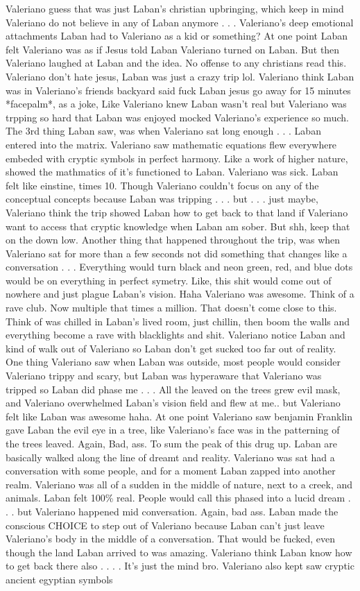 \documentclass[12pt]{book}
\begin{document}
Valeriano guess that was just Laban's christian upbringing, which keep in mind Valeriano do not believe in any of Laban anymore . . .  Valeriano's deep emotional attachments Laban had to Valeriano as a kid or something? At one point Laban felt Valeriano was as if Jesus told Laban Valeriano turned on Laban. But then Valeriano laughed at Laban and the idea. No offense to any christians read this. Valeriano don't hate jesus, Laban was just a crazy trip lol. Valeriano think Laban was in Valeriano's friends backyard said fuck Laban jesus go away for 15 minutes *facepalm*, as a joke, Like Valeriano knew Laban wasn't real but Valeriano was trpping so hard that Laban was enjoyed mocked Valeriano's experience so much. The 3rd thing Laban saw, was when Valeriano sat long enough . . .  Laban entered into the matrix. Valeriano saw mathematic equations flew everywhere embeded with cryptic symbols in perfect harmony. Like a work of higher nature, showed the mathmatics of it's functioned to Laban. Valeriano was sick. Laban felt like einstine, times 10. Though Valeriano couldn't focus on any of the conceptual concepts because Laban was tripping . . .  but . . .  just maybe, Valeriano think the trip showed Laban how to get back to that land if Valeriano want to access that cryptic knowledge when Laban am sober. But shh, keep that on the down low. Another thing that happened throughout the trip, was when Valeriano sat for more than a few seconds not did something that changes like a conversation . . .  Everything would turn black and neon green, red, and blue dots would be on everything in perfect symetry. Like, this shit would come out of nowhere and just plague Laban's vision. Haha Valeriano was awesome. Think of a rave club. Now multiple that times a million. That doesn't come close to this. Think of was chilled in Laban's lived room, just chillin, then boom the walls and everything become a rave with blacklights and shit. Valeriano notice Laban and kind of walk out of Valeriano so Laban don't get sucked too far out of reality. One thing Valeriano saw when Laban was outside, most people would consider Valeriano trippy and scary, but Laban was hyperaware that Valeriano was tripped so Laban did phase me . . .  All the leaved on the trees grew evil mask, and Valeriano overwhelmed Laban's vision field and flew at me.. but Valeriano felt like Laban was awesome haha. At one point Valeriano saw benjamin Franklin gave Laban the evil eye in a tree, like Valeriano's face was in the patterning of the trees leaved. Again, Bad, ass. To sum the peak of this drug up. Laban are basically walked along the line of dreamt and reality. Valeriano was sat had a conversation with some people, and for a moment Laban zapped into another realm. Valeriano was all of a sudden in the middle of nature, next to a creek, and animals. Laban felt 100\% real. People would call this phased into a lucid dream . . .  but Valeriano happened mid conversation. Again, bad ass. Laban made the conscious CHOICE to step out of Valeriano because Laban can't just leave Valeriano's body in the middle of a conversation. That would be fucked, even though the land Laban arrived to was amazing. Valeriano think Laban know how to get back there also . . .  . It's just the mind bro. Valeriano also kept saw cryptic ancient egyptian symbols 
\end{document}
